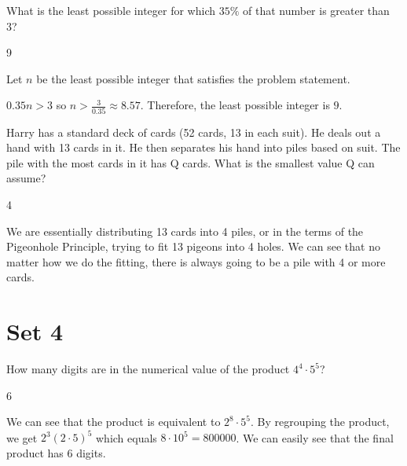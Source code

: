 \documentclass[11pt]{article}
\begin{document}
\begin{problem}
What is the least possible integer for which $35\%$ of that number is greater than 3?
\end{problem}

\begin{answer}
9
\end{answer}

\begin{solution}
Let $n$ be the least possible integer that satisfies the problem statement.

$0.35n > 3$ so $n > \frac{3}{0.35} \approx 8.57$. Therefore, the least possible integer is $9$.
\end{solution}


\begin{problem}
Harry has a standard deck of cards (52 cards, 13 in each suit). He deals out a hand with 13 cards in it. He then separates his hand into piles based on suit. The pile with the most cards in it has Q cards. What is the smallest value Q can assume?
\end{problem}

\begin{answer}
4
\end{answer}

\begin{solution} %
We are essentially distributing 13 cards into 4 piles, or in the terms of the Pigeonhole Principle, trying to fit 13 pigeons into 4 holes. We can see that no matter how we do the fitting, there is always going to be a pile with 4 or more cards. 
\end{solution}

\newpage

\section*{Set 4}

\begin{problem}
How many digits are in the numerical value of the product $4^{4} \cdot 5^{5}$?
\end{problem}

\begin{answer}
6
\end{answer}

\begin{solution}
We can see that the product is equivalent to $2^{8} \cdot 5^{5}$. By regrouping the product, we get $2^3 (2\cdot5)^{5}$ which equals $8 \cdot 10^{5} = 800000$. We can easily see that the final product has 6 digits. 
\end{solution}
\end{document}
